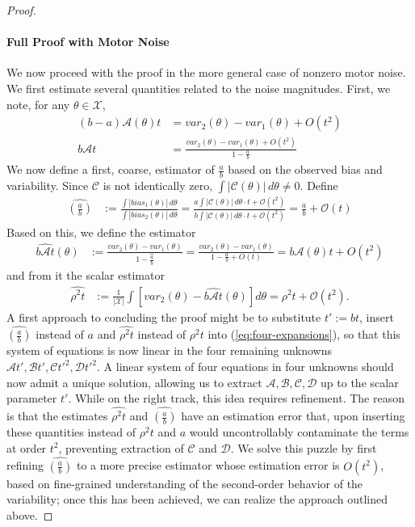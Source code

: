 \begin{proof}
\paragraph*{Full Proof with Motor Noise}
    We now proceed with the proof in the more general case of nonzero motor noise.
    We first estimate several quantities related to the noise magnitudes.
    First, we note, for any $\theta \in \mathcal{X}$,
    \begin{align*}
        (b-a)\mathcal{A}(\theta)t &= var_2(\theta) - var_1(\theta) + O(t^2)\\
        b\mathcal{A}t &= \frac{var_2(\theta) - var_1(\theta) + O(t^2)}{1 -  \frac{a}{b}}
        \end{align*}
        We now define a first, coarse, estimator of \(\frac{a}{b}\) based on the observed bias and variability.
 Since \(\mathcal{C}\) is not identically zero,  \(\int |\mathcal C(\theta)|\,d\theta\neq 0\).
Define
        \begin{align*}
        \widehat{\left(\frac{a}{b}\right)} &:= \frac{\int |bias_1(\theta)|\,d\theta}{\int |bias_2(\theta)|\,d\theta}
        = \frac{a\int|\mathcal{C}(\theta)|\,d\theta \cdot t + \mathcal{O}(t^2)}{b\int|\mathcal{C}(\theta)|\,d\theta \cdot t + \mathcal{O}(t^2)}
        = \frac{a}{b} + \mathcal{O}(t)
        \end{align*}
        Based on this, we define the estimator
        \begin{align*}
        \widehat{b\mathcal{A}t}(\theta) &:= \frac{var_2(\theta) - var_1(\theta)}{1 - \widehat{\frac{a}{b}}}
        = \frac{var_2(\theta) - var_1(\theta)}{1 - \frac{a}{b} + O(t)}
        = b\mathcal{A}(\theta)t + O(t^2)
        \end{align*}
        and from it the scalar estimator
        \begin{align*}
        \widehat{\rho^2t} &:= \frac{1}{|\mathcal{X}|}\int \left[var_2(\theta) - \widehat{b\mathcal{A}t}(\theta)\right]d\theta
        = \rho^2t + \mathcal{O}(t^2).
    \end{align*}
A first approach to concluding the proof might be to substitute $t' := bt$, insert $\widehat{(\frac{a}{b})}$ instead of $a$ and $\widehat{\rho^2t}$ instead of $\rho^2t$ into (\ref{eq:four-expansions}), so that this system of equations is now linear in the four remaining unknowns $\mathcal{A}t', \mathcal{B}t', \mathcal{C}t'^2, \mathcal{D}t'^2$. A linear system of four equations in four unknowns should now admit a unique solution, allowing us to extract $\mathcal{A}, \mathcal{B}, \mathcal{C}, \mathcal{D}$ up to the scalar parameter $t'$. While on the right track, this idea requires refinement. The reason is that the estimates $\widehat{\rho^2t}$ and $\widehat{(\frac{a}{b})}$ have an estimation error that, upon inserting these quantities instead of $\rho^2t$ and $a$ would uncontrollably contaminate the terms at order $t^2$, preventing extraction of $\mathcal{C}$ and $\mathcal{D}$. We solve this puzzle by first refining $\widehat{(\frac{a}{b})}$ to a more precise estimator whose estimation error is $O(t^2)$, based on fine-grained understanding of the second-order behavior of the variability; once this has been achieved, we can realize the approach outlined above.





\end{proof}
